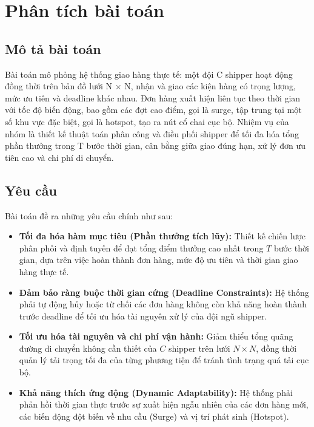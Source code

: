 \documentclass[conference]{IEEEtran}
\begin{document}
\section{Phân tích bài toán}
\subsection{Mô tả bài toán}
Bài toán mô phỏng hệ thống giao hàng thực tế: một đội C shipper hoạt động đồng thời trên bản đồ lưới N × N, nhận và giao các kiện hàng có trọng lượng, mức ưu tiên và deadline khác nhau. Đơn hàng xuất hiện liên tục theo thời gian với tốc độ biến động, bao gồm các đợt cao điểm, gọi là surge, tập trung tại một số khu vực đặc biệt, gọi là hotspot, tạo ra nút cổ chai cục bộ. Nhiệm vụ của nhóm là thiết kế thuật toán phân công và điều phối shipper để tối đa hóa tổng phần thưởng trong T bước thời gian, cân bằng giữa giao đúng hạn, xử lý đơn ưu tiên cao và chi phí di chuyển.

\subsection{Yêu cầu}
Bài toán đề ra những yêu cầu chính như sau:

\begin{itemize}
    \item \textbf{Tối đa hóa hàm mục tiêu (Phần thưởng tích lũy):} Thiết kế chiến lược phân phối và định tuyến để đạt tổng điểm thưởng cao nhất trong $T$ bước thời gian, dựa trên việc hoàn thành đơn hàng, mức độ ưu tiên và thời gian giao hàng thực tế.
    \item \textbf{Đảm bảo ràng buộc thời gian cứng (Deadline Constraints):} Hệ thống phải tự động hủy hoặc từ chối các đơn hàng không còn khả năng hoàn thành trước deadline để tối ưu hóa tài nguyên xử lý của đội ngũ shipper.
    \item \textbf{Tối ưu hóa tài nguyên và chi phí vận hành:} Giảm thiểu tổng quãng đường di chuyển không cần thiết của $C$ shipper trên lưới $N \times N$, đồng thời quản lý tải trọng tối đa của từng phương tiện để tránh tình trạng quá tải cục bộ.
    \item \textbf{Khả năng thích ứng động (Dynamic Adaptability):} Hệ thống phải phản hồi thời gian thực trước sự xuất hiện ngẫu nhiên của các đơn hàng mới, các biến động đột biến về nhu cầu (Surge) và vị trí phát sinh (Hotspot).
\end{itemize}
\end{document}
